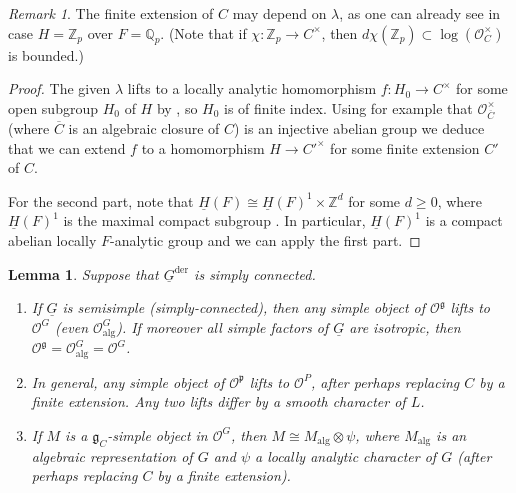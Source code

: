 \documentclass[a4paper]{amsart}
\numberwithin{equation}{section}
\newtheorem{lem}[thm]{Lemma}
\theoremstyle{remark}
\newtheorem{remark}[thm]{Remark}
\theoremstyle{definition}
\newcommand{\Z}{\mathbb{Z}}
\newcommand{\Q}{\mathbb{Q}}
\newcommand{\alggrp}[1]{\underline{#1}}
\newcommand{\der}{\mathrm{der}}
\newcommand{\alg}{\mathrm{alg}}
\begin{document}
\begin{remark}\label{rk:base-ext}
  The finite extension of $C$ may depend on $\lambda$, as one can already see in case $H = \Z_{p}$ over $F = \Q_{p}$.
  (Note that if $\chi \colon \Z_{p} \to C^{\times}$, then $d\chi(\Z_{p}) \subset \log(\mathcal{O}^{\times}_{C})$ is bounded.)
\end{remark}

\begin{proof}
  The given $\lambda$ lifts to a locally analytic homomorphism $f \colon H_0 \to C^{\times}$ for some open subgroup $H_0$ of $H$ by \cite[Proposition~18.17]{MR2810332},
  so $H_0$ is of finite index. Using for example that $\mathcal{O}_{\overline{C}}^{\times}$ (where $\overline{C}$ is an algebraic closure of $C$) is an injective abelian group we deduce that we can extend
  $f$ to a homomorphism $H \to {C'}^{\times}$ for some finite extension $C'$ of $C$.  

  For the second part, note that $\alggrp{H}(F) \cong \alggrp{H}(F)^1 \times \Z^{d}$ for some $d \ge 0$, where $\alggrp{H}(F)^1$ is the maximal compact subgroup \cite[\S2.5(b), (c)]{KP}.
  In particular, $\alggrp{H}(F)^1$ is a compact abelian locally $F$-analytic group and we can apply the first part.
\end{proof}

\begin{lem}\label{lem:semisimple-lift}
  Suppose that $\alggrp{G}^{\der}$ is simply connected.   \begin{enumerate}
  \item If $\alggrp{G}$ is semisimple (simply-connected), then any simple object of $\mathcal{O}^{\mathfrak{g}}$ lifts to $\mathcal{O}^{G}$ (even $\mathcal{O}_\alg^{G}$). \label{lem:semisimple-lift-1}
    If moreover all simple factors of $\alggrp{G}$ are isotropic, then $\mathcal{O}^{\mathfrak{g}} = \mathcal{O}_\alg^{G} = \mathcal{O}^{G}$.
  \item In general, any simple object of $\mathcal{O}^{\mathfrak{p}}$ lifts to $\mathcal{O}^{P}$, after perhaps replacing $C$ by a finite extension. \label{lem:semisimple-lift-2}
    Any two lifts differ by a smooth character of $L$.
  \item If $M$ is a $\mathfrak{g}_{C}$-simple object in $\mathcal{O}^{G}$, then $M \cong M_\alg \otimes \psi$, where $M_\alg$ is an algebraic representation of $G$ and 
    $\psi$ a locally analytic character of $G$ (after perhaps replacing $C$ by a finite extension). \label{lem:semisimple-lift-3}
  \end{enumerate}
\end{lem}
\end{document}
